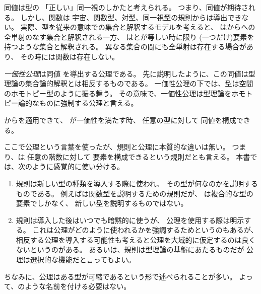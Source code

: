 \documentclass[index]{subfiles}
\begin{document}

同値は型の
「正しい」同一視のしかたと考えられる。
つまり、同値が期待される。
しかし、関数は
宇宙、関数型、対型、同一視型の規則からは導出できない。
実際、型を従来の意味での集合と解釈するモデルを考えると、
はからへの
全単射のなす集合と解釈される一方、
はとが等しい時に限り
(一つだけ)要素を持つような集合と解釈される。
異なる集合の間にも全単射は存在する場合があり、
その時には関数は存在しない。

\emph{一価性公理}は同値
を導出する公理である。
先に説明したように、この同値は型理論の集合論的解釈とは相反するものである。
一価性公理の下では、型は空間のホモトピー型のように振る舞う。
その意味で、一価性公理は型理論をホモトピー論的なものに強制する公理と言える。




からを適用できて、
が一価性を満たす時、
任意の型に対して
同値を構成できる。



ここで公理という言葉を使ったが、規則と公理に本質的な違いは無い。
つまり、は
任意の階数に対して
要素を構成できるという規則だとも言える。
本書では、次のように感覚的に使い分ける。
\begin{enumerate}
\item 規則は新しい型の種類を導入する際に使われ、
  その型が何なのかを説明するものである。
  例えばは関数型を説明するための規則だが、
  は複合的な型の要素でしかなく、
  新しい型を説明するものではない。
\item 規則は導入した後はいつでも暗黙的に使うが、
  公理を使用する際は明示する。
  これは公理がどのように使われるかを強調するためというのもあるが、
  相反する公理を導入する可能性も考えると公理を大域的に仮定するのは良くないというのがある。
  あるいは、規則は型理論の基盤にあたるものだが
  公理は選択的な機能だと言ってもよい。
\end{enumerate}
ちなみに、公理はある型が可縮であるという形で述べられることが多い。
よって、のような名前を付ける必要はない。
\end{document}
